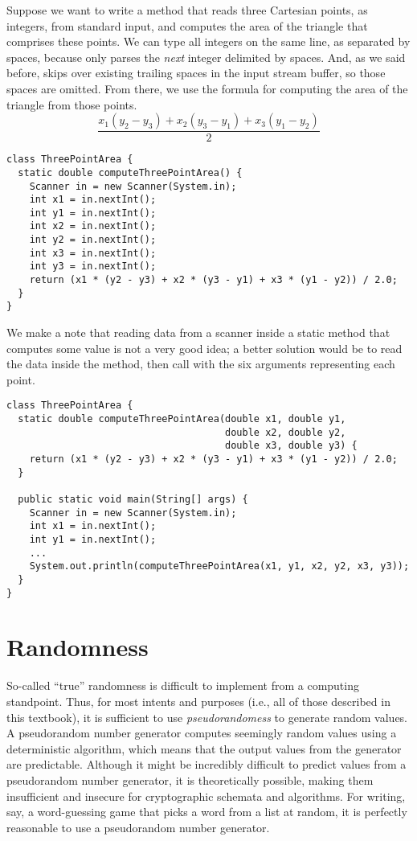 \example Suppose we want to write a method that reads three Cartesian points, as integers, from standard input, and computes the area of the triangle that comprises these points. We can type all integers on the same line, as separated by spaces, because  only parses the \textit{next} integer delimited by spaces. And, as we said before,  skips over existing trailing spaces in the input stream buffer, so those spaces are omitted. From there, we use the formula for computing the area of the triangle from those points. 
\[
\dfrac{x_1(y_2 - y_3) + x_2(y_3 - y_1) + x_3 (y_1 - y_2)}{2}
\]
\begin{cl}{}
\begin{lstlisting}[language=MyJava]
class ThreePointArea {
  static double computeThreePointArea() {
    Scanner in = new Scanner(System.in);
    int x1 = in.nextInt();
    int y1 = in.nextInt();
    int x2 = in.nextInt();
    int y2 = in.nextInt();
    int x3 = in.nextInt();
    int y3 = in.nextInt();
    return (x1 * (y2 - y3) + x2 * (y3 - y1) + x3 * (y1 - y2)) / 2.0;
  }
}
\end{lstlisting}
\end{cl}
We make a note that reading data from a scanner inside a static method that computes some value is not a very good idea; a better solution would be to read the data inside the  method, then call  with the six arguments representing each point.
\begin{cl}{}
\begin{lstlisting}[language=MyJava]
class ThreePointArea {
  static double computeThreePointArea(double x1, double y1,
                                      double x2, double y2,
                                      double x3, double y3) {
    return (x1 * (y2 - y3) + x2 * (y3 - y1) + x3 * (y1 - y2)) / 2.0;
  }

  public static void main(String[] args) {
    Scanner in = new Scanner(System.in);
    int x1 = in.nextInt();
    int y1 = in.nextInt();
    ...
    System.out.println(computeThreePointArea(x1, y1, x2, y2, x3, y3));
  }
}
\end{lstlisting}
\end{cl}

\section{Randomness}
So-called ``true'' randomness is difficult to implement from a computing standpoint. Thus, for most intents and purposes (i.e., all of those described in this textbook), it is sufficient to use \textit{pseudorandomess} to generate random values. A pseudorandom number generator computes seemingly random values using a deterministic algorithm, which means that the output values from the generator are predictable. Although it might be incredibly difficult to predict values from a pseudorandom number generator, it is theoretically possible, making them insufficient and insecure for cryptographic schemata and algorithms. For writing, say, a word-guessing game that picks a word from a list at random, it is perfectly reasonable to use a pseudorandom number generator.

